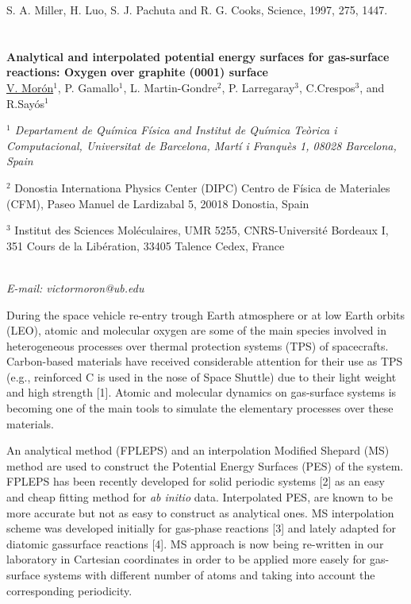 {\footnotesize
\noindent
[1] S. A. Miller, H. Luo, S. J. Pachuta and R. G. Cooks, Science, 1997, 275, 1447.
}
\newpage
\setcounter{figure}{0}
\section*{}
\begin{center}
{\bf \Large
Analytical and interpolated potential energy surfaces for
gas-surface reactions: Oxygen over graphite (0001) surface
}
\\
\vspace{0.5cm}
\underline{V. Morón}$^{1}$, P. Gamallo$^{1}$, L. Martin-Gondre$^{2}$, P. Larregaray$^{3}$, C.Crespos$^{3}$, and
R.Sayós$^{1}$
\\
\vspace{0.5cm}
{\it
$^{1}$ Departament de Química Física and Institut de Química Teòrica i Computacional, Universitat de
Barcelona, Martí i Franquès 1, 08028 Barcelona, Spain

$^{2}$ Donostia Internationa Physics Center (DIPC) Centro de Física de Materiales (CFM), Paseo
Manuel de Lardizabal 5, 20018 Donostia, Spain

$^{3}$ Institut des Sciences Moléculaires, UMR 5255, CNRS-Université Bordeaux I, 351 Cours de la
Libération, 33405 Talence Cedex, France
}
\\
\vspace{0.5cm}
{\it E-mail: victormoron@ub.edu}
\\
\vspace{0.5cm}
\end{center}
During the space vehicle re-entry trough Earth atmosphere or at low Earth orbits
(LEO), atomic and molecular oxygen are some of the main species involved in
heterogeneous processes over thermal protection systems (TPS) of spacecrafts.
Carbon-based materials have received considerable attention for their use as TPS
(e.g., reinforced C is used in the nose of Space Shuttle) due to their light weight and
high strength [1]. Atomic and molecular dynamics on gas-surface systems is
becoming one of the main tools to simulate the elementary processes over these
materials.

An analytical method (FPLEPS) and an interpolation Modified Shepard (MS)
method are used to construct the Potential Energy Surfaces (PES) of the system.
FPLEPS has been recently developed for solid periodic systems [2] as an easy and
cheap fitting method for \textit{ab initio} data. Interpolated PES, are known to be more
accurate but not as easy to construct as analytical ones. MS interpolation scheme was
developed initially for gas-phase reactions [3] and lately adapted for diatomic gassurface reactions [4].
MS approach is now being re-written in our laboratory in
Cartesian coordinates in order to be applied more easely for gas-surface systems with
different number of atoms and taking into account the corresponding periodicity.

